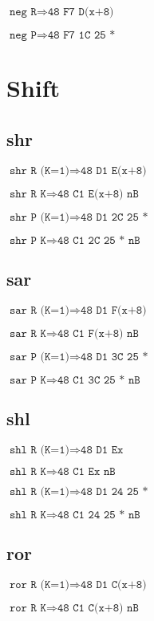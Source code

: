 \documentclass{article}
\begin{document}
$\texttt{neg R} \Rightarrow \texttt{48 F7 D(x+8)}$

$\texttt{neg P} \Rightarrow \texttt{48 F7 1C 25 *}$


\section{Shift}

\subsection{shr}

$\texttt{shr R (K=1)} \Rightarrow \texttt{48 D1 E(x+8)}$

$\texttt{shr R K} \Rightarrow \texttt{48 C1 E(x+8) nB}$

$\texttt{shr P (K=1)} \Rightarrow \texttt{48 D1 2C 25 *}$

$\texttt{shr P K} \Rightarrow \texttt{48 C1 2C 25 * nB}$


\subsection{sar}

$\texttt{sar R (K=1)} \Rightarrow \texttt{48 D1 F(x+8)}$

$\texttt{sar R K} \Rightarrow \texttt{48 C1 F(x+8) nB}$

$\texttt{sar P (K=1)} \Rightarrow \texttt{48 D1 3C 25 *}$

$\texttt{sar P K} \Rightarrow \texttt{48 C1 3C 25 * nB}$


\subsection{shl}

$\texttt{shl R (K=1)} \Rightarrow \texttt{48 D1 Ex}$

$\texttt{shl R K} \Rightarrow \texttt{48 C1 Ex nB}$

$\texttt{shl R (K=1)} \Rightarrow \texttt{48 D1 24 25 *}$

$\texttt{shl R K} \Rightarrow \texttt{48 C1 24 25 * nB}$


\subsection{ror}

$\texttt{ror R (K=1)} \Rightarrow \texttt{48 D1 C(x+8)}$

$\texttt{ror R K} \Rightarrow \texttt{48 C1 C(x+8) nB}$
\end{document}
